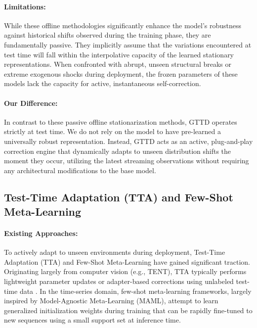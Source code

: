 \documentclass{article}
\begin{document}
	\paragraph{Limitations:} While these offline methodologies significantly enhance the model's robustness against historical shifts observed during the training phase, they are fundamentally passive. They implicitly assume that the variations encountered at test time will fall within the interpolative capacity of the learned stationary representations. When confronted with abrupt, unseen structural breaks or extreme exogenous shocks during deployment, the frozen parameters of these models lack the capacity for active, instantaneous self-correction.
	
	\paragraph{Our Difference:} In contrast to these passive offline stationarization methods, GTTD operates strictly at test time. We do not rely on the model to have pre-learned a universally robust representation. Instead, GTTD acts as an active, plug-and-play correction engine that dynamically adapts to unseen distribution shifts the moment they occur, utilizing the latest streaming observations without requiring any architectural modifications to the base model.
	
	\subsection{Test-Time Adaptation (TTA) and Few-Shot Meta-Learning}
	\paragraph{Existing Approaches:} To actively adapt to unseen environments during deployment, Test-Time Adaptation (TTA) and Few-Shot Meta-Learning have gained significant traction. Originating largely from computer vision (e.g., TENT), TTA typically performs lightweight parameter updates or adapter-based corrections using unlabeled test-time data \cite{karmanov2024efficient, yuan2024tea, shin2024tta, jia2024tinytta}. In the time-series domain, few-shot meta-learning frameworks, largely inspired by Model-Agnostic Meta-Learning (MAML)\cite{finn2017model}, attempt to learn generalized initialization weights during training that can be rapidly fine-tuned to new sequences using a small support set at inference time\cite{wang2025test}.
	
\end{document}
